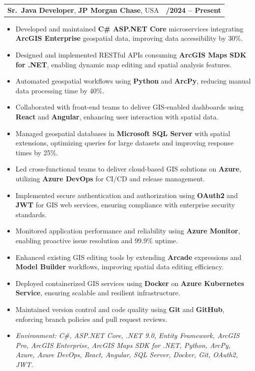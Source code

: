 \documentclass[letterpaper,11pt]{article}
\makeatletter
\newcommand{\resumeItem}[1]{
  \item\footnotesize{
    {#1 \vspace{-2pt}}
  }
}
\newcommand{\resumeSubheading}[4]{
  \vspace{-2pt}\item
    \begin{tabular*}{1.0\textwidth}[t]{l@{\extracolsep{\fill}}r}
      \textbf{\fontsize{10pt}{14pt}\selectfont #3}, \textbf{\fontsize{10pt}{14pt}\selectfont #1}, \fontsize{10pt}{14pt}\selectfont #4 & \textbf{\fontsize{10pt}{14pt}\selectfont #2} \\
    \end{tabular*}\vspace{-7pt}
}
\newcommand{\resumeItemListStart}{\begin{itemize}[leftmargin=*]}
\newcommand{\resumeItemListEnd}{\end{itemize}\vspace{-5pt}}
\makeatother
\begin{document}
\resumeSubheading
{JP Morgan Chase}{09/2024 -- Present}
{Sr.\ Java Developer}{USA}
\resumeItemListStart
  \resumeItem{Developed and maintained \textbf{C\# ASP.NET Core} microservices integrating \textbf{ArcGIS Enterprise} geospatial data, improving data accessibility by 30\%.}
  \resumeItem{Designed and implemented RESTful APIs consuming \textbf{ArcGIS Maps SDK for .NET}, enabling dynamic map editing and spatial analysis features.}
  \resumeItem{Automated geospatial workflows using \textbf{Python} and \textbf{ArcPy}, reducing manual data processing time by 40\%.}
  \resumeItem{Collaborated with front-end teams to deliver GIS-enabled dashboards using \textbf{React} and \textbf{Angular}, enhancing user interaction with spatial data.}
  \resumeItem{Managed geospatial databases in \textbf{Microsoft SQL Server} with spatial extensions, optimizing queries for large datasets and improving response times by 25\%.}
  \resumeItem{Led cross-functional teams to deliver cloud-based GIS solutions on \textbf{Azure}, utilizing \textbf{Azure DevOps} for CI/CD and release management.}
  \resumeItem{Implemented secure authentication and authorization using \textbf{OAuth2} and \textbf{JWT} for GIS web services, ensuring compliance with enterprise security standards.}
  \resumeItem{Monitored application performance and reliability using \textbf{Azure Monitor}, enabling proactive issue resolution and 99.9\% uptime.}
  \resumeItem{Enhanced existing GIS editing tools by extending \textbf{Arcade} expressions and \textbf{Model Builder} workflows, improving spatial data editing efficiency.}
  \resumeItem{Deployed containerized GIS services using \textbf{Docker} on \textbf{Azure Kubernetes Service}, ensuring scalable and resilient infrastructure.}
  \resumeItem{Maintained version control and code quality using \textbf{Git} and \textbf{GitHub}, enforcing branch policies and pull request reviews.}
  \resumeItem{\textit{Environment: C\#, ASP.NET Core, .NET 9.0, Entity Framework, ArcGIS Pro, ArcGIS Enterprise, ArcGIS Maps SDK for .NET, Python, ArcPy, Azure, Azure DevOps, React, Angular, SQL Server, Docker, Git, OAuth2, JWT.}}
\resumeItemListEnd
\end{document}

